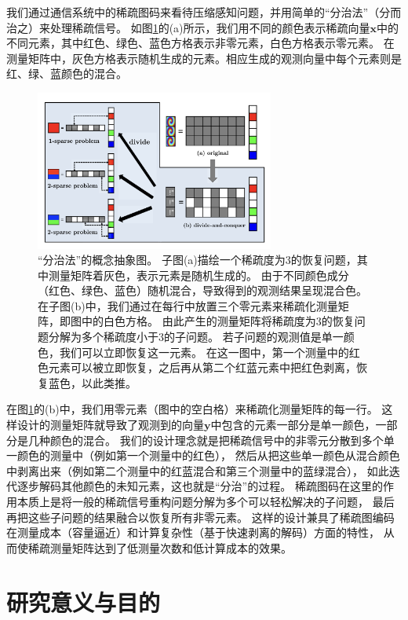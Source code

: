 \documentclass[AutoFakeBold]{LZUThesis}
\begin{document}
我们通过通信系统中的稀疏图码来看待压缩感知问题，并用简单的“分治法”（分而治之）来处理稀疏信号。
如图\ref{fig_divide_conquer}的(a)所示，我们用不同的颜色表示稀疏向量$\mathbf{x}$中的不同元素，其中红色、绿色、蓝色方格表示非零元素，白色方格表示零元素。
在测量矩阵中，灰色方格表示随机生成的元素。相应生成的观测向量中每个元素则是红、绿、蓝颜色的混合。
\begin{figure}[H]
    \centering
    \includegraphics[width=0.7\textwidth]{figures/d_n_c.png}
    \caption{“分治法”的概念抽象图。
    子图(a)描绘一个稀疏度为3的恢复问题，其中测量矩阵着灰色，表示元素是随机生成的。
    由于不同颜色成分（红色、绿色、蓝色）随机混合，导致得到的观测结果呈现混合色。
    在子图(b)中，我们通过在每行中放置三个零元素来稀疏化测量矩阵，即图中的白色方格。
    由此产生的测量矩阵将稀疏度为3的恢复问题分解为多个稀疏度小于3的子问题。
    若子问题的观测值是单一颜色，我们可以立即恢复这一元素。
    在这一图中，第一个测量中的红色元素可以被立即恢复，之后再从第二个红蓝元素中把红色剥离，恢复蓝色，以此类推。}
    \label{fig_divide_conquer}
\end{figure}
在图\ref{fig_divide_conquer}的(b)中，我们用零元素（图中的空白格）来稀疏化测量矩阵的每一行。
这样设计的测量矩阵就导致了观测到的向量$\mathbf{y}$中包含的元素一部分是单一颜色，一部分是几种颜色的混合。
我们的设计理念就是把稀疏信号中的非零元分散到多个单一颜色的测量中（例如第一个测量中的红色），
然后从把这些单一颜色从混合颜色中剥离出来（例如第二个测量中的红蓝混合和第三个测量中的蓝绿混合），
如此迭代逐步解码其他颜色的未知元素，这也就是“分治”的过程。
稀疏图码在这里的作用本质上是将一般的稀疏信号重构问题分解为多个可以轻松解决的子问题，
最后再把这些子问题的结果融合以恢复所有非零元素。
这样的设计兼具了稀疏图编码在测量成本（容量逼近）和计算复杂性（基于快速剥离的解码）方面的特性，
从而使稀疏测量矩阵达到了低测量次数和低计算成本的效果。


\section{研究意义与目的}
\end{document}
